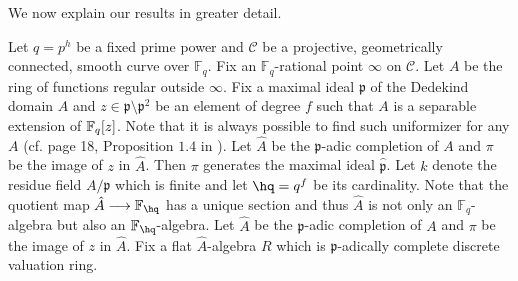 \documentclass{amsart}
\numberwithin {equation}{section}
\newcommand{\bb}[1]{\mathbb{#1}}
\begin{document}
%

We now explain our results in greater detail. 

\cblue
Let $q=p^{h}$ be a fixed prime power and $\mathcal{C}$ be a projective, geometrically connected, smooth curve over $\mathbb{F}_{q}$. Fix an $\mathbb{F}_{q}$-rational point $\infty$ on $\mathcal{C}$. Let $A$ be the ring of functions regular outside $\infty$. Fix a maximal ideal $\mathfrak{p}$ of the Dedekind domain
$A$ and $z\in \mathfrak{p}\setminus \mathfrak{p}^{2}$ be an element of degree $f$ such that $A$ is a separable extension of $\mathbb{F}_{q}[z]$. Note that it is always possible to find such uniformizer for any $A$ (cf. page 18, Proposition $1.4$ in \cite{Silverman}). Let $\hat{A}$  be the $\mathfrak{p}$-adic completion  
of $A$ and $\pi$ be the image of $z$ in $\hat{A}$. Then $\pi$ generates the maximal ideal $\hat{\mathfrak{p}}$. Let $k$ denote the residue field $A/\mathfrak{p}$ which is finite and let $\hq=q^{f}$ be its cardinality. Note that the quotient map $\hat{A}\longrightarrow \FF_{\hq}$ has a unique section and thus $\hat{A}$ is not only an $\mathbb{F}_{q}$-algebra but also an $\FF_{\hq}$-algebra.
Let $\hat{A}$  be the $\mathfrak{p}$-adic completion  
of $A$ and $\pi$ be the image of $z$ in $\hat{A}$. Fix a flat $\hat{A}$-algebra $R$ which is 
$\mathfrak{p}$-adically complete discrete valuation ring. 
\end{document}
